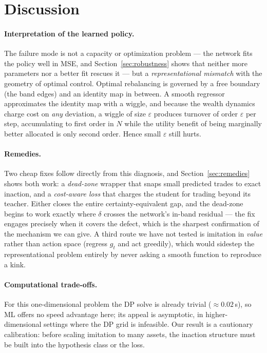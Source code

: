 \documentclass[11pt]{article}
\begin{document}
\section{Discussion}

\paragraph{Interpretation of the learned policy.}
The failure mode is not a capacity or optimization problem --- the network fits
the policy well in MSE, and Section~\ref{sec:robustness} shows that neither more
parameters nor a better fit rescues it --- but a \emph{representational mismatch} with the
geometry of optimal control. Optimal rebalancing is governed by a free boundary
(the band edges) and an identity map in between. A smooth regressor approximates
the identity map with a wiggle, and because the wealth dynamics charge cost on
\emph{any} deviation, a wiggle of size $\varepsilon$ produces turnover of order
$\varepsilon$ per step, accumulating to first order in $N$ while the utility
benefit of being marginally better allocated is only second order. Hence small
$\varepsilon$ still hurts.

\paragraph{Remedies.}
Two cheap fixes follow directly from this diagnosis, and
Section~\ref{sec:remedies} shows both work: a \emph{dead-zone} wrapper that
snaps small predicted trades to exact inaction, and a \emph{cost-aware loss}
that charges the student for trading beyond its teacher. Either closes the
entire certainty-equivalent gap, and the dead-zone begins to work exactly where
$\delta$ crosses the network's in-band residual --- the fix engages precisely
when it covers the defect, which is the sharpest confirmation of the mechanism
we can give. A third route we have not tested is imitation in \emph{value}
rather than action space (regress $g_t$ and act greedily), which would sidestep
the representational problem entirely by never asking a smooth function to
reproduce a kink.

\paragraph{Computational trade-offs.}
For this one-dimensional problem the DP solve is already trivial
($\approx 0.02$\,s), so ML offers no speed advantage here; its appeal is
asymptotic, in higher-dimensional settings where the DP grid is infeasible. Our
result is a cautionary calibration: before scaling imitation to many assets, the
inaction structure must be built into the hypothesis class or the loss.
\end{document}

